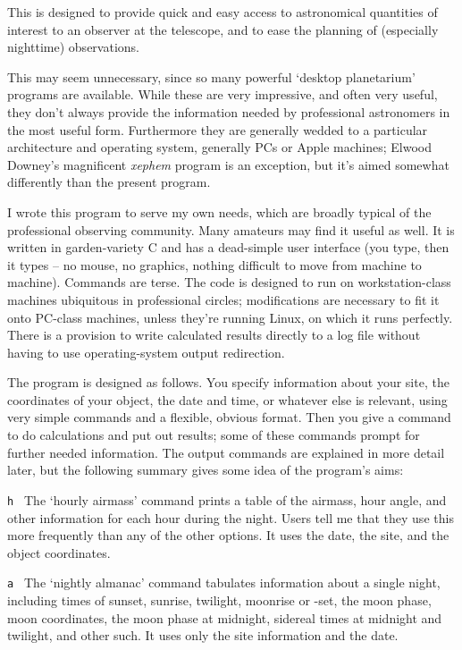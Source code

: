 
This is designed to provide quick and easy access to
astronomical quantities of interest to an observer at the telescope,
and to ease the planning of (especially nighttime) observations.

This may seem unnecessary, since so many powerful `desktop planetarium' 
programs are available.
While these are very impressive, and often very useful, they
don't always provide the information needed by professional astronomers
in the most useful form.  Furthermore they are generally wedded to a 
particular architecture and operating system, generally PCs or
Apple machines; Elwood Downey's magnificent {\it xephem} program 
is an exception, but it's aimed somewhat differently than the present
program.  

I wrote this program to serve my own needs, which
are broadly typical of the professional observing community.
Many amateurs may find it useful as well.
It is written in garden-variety
C and has a dead-simple user interface (you type, then it types -- no
mouse, no graphics, nothing difficult to move from machine to machine).
Commands are terse.
The code is designed to run on workstation-class machines ubiquitous
in professional circles; modifications are necessary to fit it onto
PC-class machines, unless they're running Linux, on which it runs
perfectly.  There is a provision to write calculated results
directly to a log file without having to use operating-system
output redirection.

The program is designed as follows.  You specify information about 
your site, the coordinates of your object, the date and time, or
whatever else is relevant, using very simple commands and a flexible,
obvious format.  Then you give a command to do calculations
and put out results; some of these commands prompt for further
needed information.  The output commands are
explained in more detail later, but the following summary gives some idea
of the program's aims:

\item{\tt h } The `hourly airmass' command prints a table of the 
airmass, hour angle, and other information for each hour during the
night.  Users tell me that they use this more frequently than any
of the other options.  It uses the date, the site, and the object coordinates. 

\item{\tt a } The `nightly almanac' command tabulates information
about a single night, including times of sunset, sunrise, twilight, moonrise
or -set, the moon phase, moon coordinates, the moon phase at midnight,
sidereal times at midnight and twilight, and other such.  It uses
only the site information and the date.


